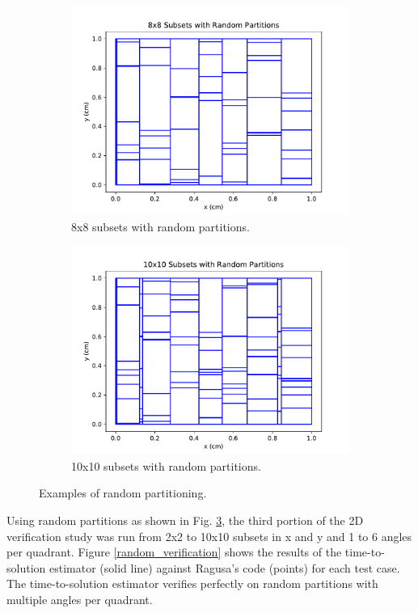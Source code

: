 \begin{figure}[H]
\begin{subfigure}[b]{0.45\textwidth}
  \includegraphics[width=\textwidth]{../cut_line_files/8_random.pdf}
  \caption{8x8 subsets with random partitions.}
  \label{8random}
\end{subfigure}
\begin{subfigure}[b]{0.45\textwidth}
  \includegraphics[width=\textwidth]{../cut_line_files/10_random.pdf}
  \caption{10x10 subsets with random partitions.}
  \label{10random}
\end{subfigure}
\caption{Examples of random partitioning.}
\label{random_partitions}
\end{figure}

Using random partitions as shown in Fig. \ref{random_partitions}, the third portion of the 2D verification study was run from 2x2 to 10x10 subsets in x and y and 1 to 6 angles per quadrant.  Figure \ref{random_verification} shows the results of the time-to-solution estimator (solid line) against Ragusa's code (points) for each test case. The time-to-solution estimator verifies perfectly on random partitions with multiple angles per quadrant. 

